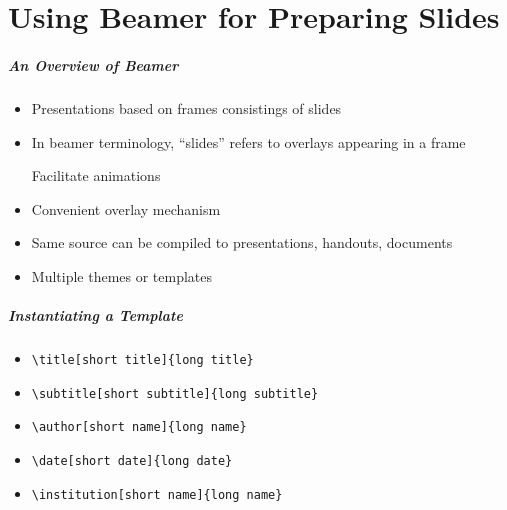 \documentclass[handout]{beamer}
\begin{document}

\part{Using Beamer for Preparing Slides}
\frame[plain]{\partpage}

\begin{frame}[fragile]
\frametitle{An Overview of Beamer}

\begin{itemize}
\item Presentations based on frames consistings of slides
\item In beamer terminology, ``slides'' refers to overlays appearing in a frame

      Facilitate animations
\item Convenient overlay mechanism
\item Same source can be compiled to presentations, handouts, documents
\item Multiple themes or templates
\end{itemize}
\end{frame}

\begin{frame}[fragile]
\frametitle{Instantiating a Template}

\begin{itemize}
\item {\tt \textbackslash title[short title]\{long title\}}
\item {\tt \textbackslash subtitle[short subtitle]\{long subtitle\}}
\item {\tt \textbackslash author[short name]\{long name\}}
\item {\tt \textbackslash date[short date]\{long date\}}
\item {\tt \textbackslash institution[short name]\{long name\}}
\end{itemize}
\end{frame}
\end{document}

